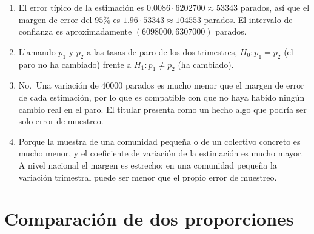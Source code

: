 \documentclass[
  spanish,
  a4paper,
]{scrreport}
\theoremstyle{definition}
\theoremstyle{remark}
\begin{document}
\begin{tcolorbox}[enhanced jigsaw, arc=.35mm, bottomrule=.15mm, bottomtitle=1mm, breakable, colback=white, colbacktitle=quarto-callout-tip-color!10!white, colframe=quarto-callout-tip-color-frame, coltitle=black, left=2mm, leftrule=.75mm, opacityback=0, opacitybacktitle=0.6, rightrule=.15mm, title=\textcolor{quarto-callout-tip-color}{\faLightbulb}\hspace{0.5em}{Solución}, titlerule=0mm, toprule=.15mm, toptitle=1mm]

\begin{enumerate}
\def\labelenumi{\alph{enumi}.}
\item
  El error típico de la estimación es
  \(0.0086\cdot 6202700\approx 53343\) parados, así que el margen de
  error del \(95\)\% es \(1.96\cdot 53343\approx 104553\) parados. El
  intervalo de confianza es aproximadamente \((6098000, 6307000)\)
  parados.
\item
  Llamando \(p_1\) y \(p_2\) a las tasas de paro de los dos trimestres,
  \(H_0: p_1=p_2\) (el paro no ha cambiado) frente a
  \(H_1: p_1\neq p_2\) (ha cambiado).
\item
  No.~Una variación de \(40000\) parados es mucho menor que el margen de
  error de cada estimación, por lo que es compatible con que no haya
  habido ningún cambio real en el paro. El titular presenta como un
  hecho algo que podría ser solo error de muestreo.
\item
  Porque la muestra de una comunidad pequeña o de un colectivo concreto
  es mucho menor, y el coeficiente de variación de la estimación es
  mucho mayor. A nivel nacional el margen es estrecho; en una comunidad
  pequeña la variación trimestral puede ser menor que el propio error de
  muestreo.
\end{enumerate}

\end{tcolorbox}

\section{Comparación de dos
proporciones}\label{comparaciuxf3n-de-dos-proporciones}
\end{document}
